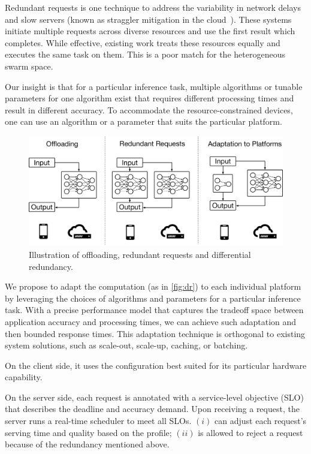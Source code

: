 Redundant requests is one technique to address the variability in network
delays~\cite{gordon2015accelerating, vulimiri2013low} and slow servers (known as
straggler mitigation in the cloud~\cite{dean2013tail,
  ananthanarayanan2013effective}). These systems initiate multiple requests
across diverse resources and use the first result which completes. While
effective, existing work treats these resources equally and executes the same
task on them. This is a poor match for the heterogeneous swarm space.

Our insight is that for a particular inference task, multiple algorithms or
tunable parameters for one algorithm exist that requires different processing
times and result in different accuracy. To accommodate the resource-constrained
devices, one can use an algorithm or a parameter that suits the particular
platform.

\begin{figure}
  \centering
  \includegraphics[width=0.8\columnwidth]{figures/dr.pdf}
  \caption{Illustration of offloading, redundant requests and differential
    redundancy.}
  \label{fig:dr}
\end{figure}

We propose to adapt the computation (as in \autoref{fig:dr}) to each individual
platform by leveraging the choices of algorithms and parameters for a particular
inference task. With a precise performance model that captures the tradeoff
space between application accuracy and processing times, we can achieve such
adaptation and then bounded response times. This adaptation technique is
orthogonal to existing system solutions, such as scale-out, scale-up, caching,
or batching.

On the client side, it uses the configuration best suited for its particular
hardware capability.

On the server side, each request is annotated with a service-level objective
(SLO) that describes the deadline and accuracy demand. Upon receiving a request,
the server runs a real-time scheduler to meet all SLOs. $(i)$ \brt{} can adjust
each request's serving time and quality based on the profile; $(ii)$ \brt{} is
allowed to reject a request because of the redundancy mentioned above.

